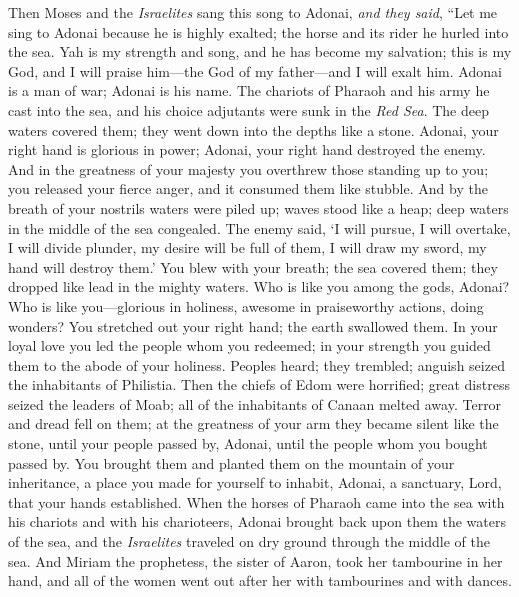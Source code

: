 \begin{biblechapter} %
 Then Moses and the \textit{Israelites} sang this song to Adonai, \textit{and they said},
\verse “Let me sing to Adonai because he is highly exalted; 
the horse and its rider he hurled into the sea.
\verse Yah is my strength and song, and he has become my salvation; 
this is my God, and I will praise him—the God of my father—and I will exalt him.
\verse Adonai is a man of war; Adonai is his name.
\verse The chariots of Pharaoh and his army he cast into the sea, 
and his choice adjutants were sunk in the \textit{Red Sea}.
\verse The deep waters covered them; 
they went down into the depths like a stone.
\verse Adonai, your right hand is glorious in power; 
Adonai, your right hand destroyed the enemy.
\verse And in the greatness of your majesty you overthrew those standing up to you; 
you released your fierce anger, and it consumed them like stubble.
\verse And by the breath of your nostrils waters were piled up; 
waves stood like a heap; 
deep waters in the middle of the sea congealed.
\verse The enemy said, ‘I will pursue, I will overtake, I will divide plunder, 
my desire will be full of them, I will draw my sword, my hand will destroy them.’
\verse You blew with your breath; the sea covered them; 
they dropped like lead in the mighty waters.
\verse Who is like you among the gods, Adonai? 
Who is like you—glorious in holiness, awesome in praiseworthy actions, doing wonders?
\verse You stretched out your right hand; 
the earth swallowed them.
\verse In your loyal love you led the people whom you redeemed; 
in your strength you guided them to the abode of your holiness.
\verse Peoples heard; they trembled; 
anguish seized the inhabitants of Philistia.
\verse Then the chiefs of Edom were horrified; great distress seized the leaders of Moab; 
all of the inhabitants of Canaan melted away.
\verse Terror and dread fell on them; 
at the greatness of your arm they became silent like the stone, 
until your people passed by, Adonai, 
until the people whom you bought passed by.
\verse You brought them and planted them on the mountain of your inheritance, 
a place you made for yourself to inhabit, Adonai, 
a sanctuary, Lord, that your hands established.
\verse When the horses of Pharaoh came into the sea with his chariots and with his charioteers, Adonai brought back upon them the waters of the sea, and the \textit{Israelites} traveled on dry ground through the middle of the sea.
\verse And Miriam the prophetess, the sister of Aaron, took her tambourine in her hand, and all of the women went out after her with tambourines and with dances.

\end{biblechapter}
